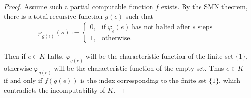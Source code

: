 \documentclass{article}
\begin{document}
\begin{enumerate}[label={\bf Q\arabic*:}]
    \begin{proof}
      Assume such a partial computable function $f$ exists. By the SMN
      theorem, there is a total recursive function $g(e)$ such that
      \begin{align*}
        \varphi_{g(e)}(s) :=
        \begin{cases}
          0, &\text{if}\; \varphi_{e}(e)\; \text{has not halted after}\;
            s\; \text{steps}\\
          1, &\text{otherwise}.
        \end{cases}
      \end{align*}

      Then if $e\in K$ halts, $\varphi_{g(e)}$ will be the characteristic
      function of the finite set $\{1\}$, otherwise $\varphi_{g(e)}$ will
      be the characteristic function of the empty set. Thus $e\in K$ if and
      only if $f(g(e))$ is the index corresponding to the finite set
      $\{1\}$, which contradicts the incomputability of $K$.
    \end{proof}
\end{enumerate}
\end{document}
